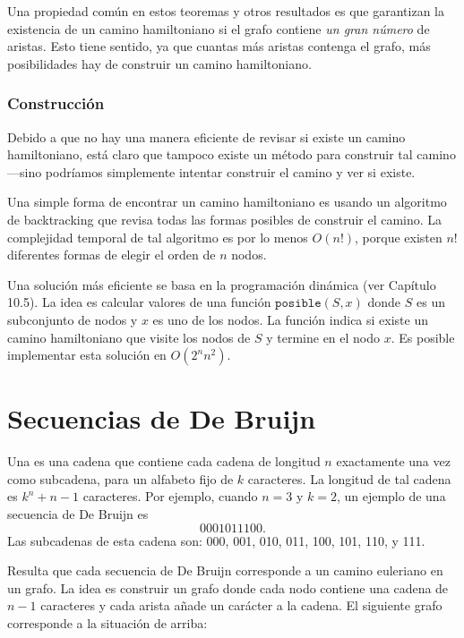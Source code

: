 Una propiedad común en estos teoremas y otros resultados es que
garantizan la existencia de un camino hamiltoniano si el grafo contiene
\emph{un gran número} de aristas. Esto tiene sentido, ya que cuantas más
aristas contenga el grafo, más posibilidades hay de construir un camino
hamiltoniano.

\subsubsection{Construcción}

Debido a que no hay una manera eficiente de revisar si existe un
camino hamiltoniano, está claro que tampoco existe un método para
construir tal camino---sino podríamos simplemente intentar construir
el camino y ver si existe.

Una simple forma de encontrar un camino hamiltoniano es usando un
algoritmo de backtracking que revisa todas las formas posibles de
construir el camino. La complejidad temporal de tal algoritmo es
por lo menos $O(n!)$, porque existen $n!$ diferentes formas de elegir
el orden de $n$ nodos.

Una solución más eficiente se basa en la programación dinámica (ver
Capítulo 10.5). La idea es calcular valores de una función
$\texttt{posible}(S,x)$ donde $S$ es un subconjunto de nodos y $x$
es uno de los nodos. La función indica si existe un camino hamiltoniano
que visite los nodos de $S$ y termine en el nodo $x$. Es posible
implementar esta solución en $O(2^n n^2)$.

\section{Secuencias de De Bruijn}


Una  es una cadena que contiene cada cadena
de longitud $n$ exactamente una vez como subcadena, para un alfabeto
fijo de $k$ caracteres. La longitud de tal cadena es $k^n+n-1$ caracteres.
Por ejemplo, cuando $n=3$ y $k=2$, un ejemplo de una secuencia de
De Bruijn es \[0001011100.\]
Las subcadenas de esta cadena son:
000, 001, 010, 011, 100, 101, 110, y 111.

Resulta que cada secuencia de De Bruijn corresponde a un camino euleriano
en un grafo. La idea es construir un grafo donde cada nodo contiene una
cadena de $n-1$ caracteres y cada arista añade un carácter a la cadena.
El siguiente grafo corresponde a la situación de arriba:

